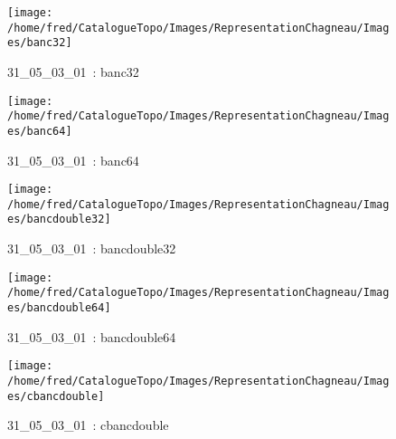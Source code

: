 \documentclass[12pt,titlepage]{book}
\begin{document}
\begin{figure}[h!]
  \hfill         %
  \begin{minipage}[t]{3cm}
    \begin{center}
      \texttt{[image: /home/fred/CatalogueTopo/Images/RepresentationChagneau/Images/banc32]}
      \caption[~31\_05\_03\_01]{\small{31\_05\_03\_01~:} \tiny{banc32}}\label{banc32}
    \end{center}
  \end{minipage}
  \begin{minipage}[t]{3cm}
    \begin{center}
      \texttt{[image: /home/fred/CatalogueTopo/Images/RepresentationChagneau/Images/banc64]}
      \caption[~31\_05\_03\_01]{\small{31\_05\_03\_01~:} \tiny{banc64}}\label{banc64}
    \end{center}
  \end{minipage}
  \begin{minipage}[t]{3cm}
    \begin{center}
      \texttt{[image: /home/fred/CatalogueTopo/Images/RepresentationChagneau/Images/bancdouble32]}
      \caption[~31\_05\_03\_01]{\small{31\_05\_03\_01~:} \tiny{bancdouble32}}\label{bancdouble32}
    \end{center}
  \end{minipage}
  \begin{minipage}[t]{3cm}
    \begin{center}
      \texttt{[image: /home/fred/CatalogueTopo/Images/RepresentationChagneau/Images/bancdouble64]}
      \caption[~31\_05\_03\_01]{\small{31\_05\_03\_01~:} \tiny{bancdouble64}}\label{bancdouble64}
    \end{center}
  \end{minipage}
  \begin{minipage}[t]{3cm}
    \begin{center}
      \texttt{[image: /home/fred/CatalogueTopo/Images/RepresentationChagneau/Images/cbancdouble]}
      \caption[~31\_05\_03\_01]{\small{31\_05\_03\_01~:} \tiny{cbancdouble}}\label{cbancdouble}
    \end{center}
  \end{minipage}
  \begin{minipage}[t]{3cm}

\end{minipage}
\end{figure}
\end{document}
